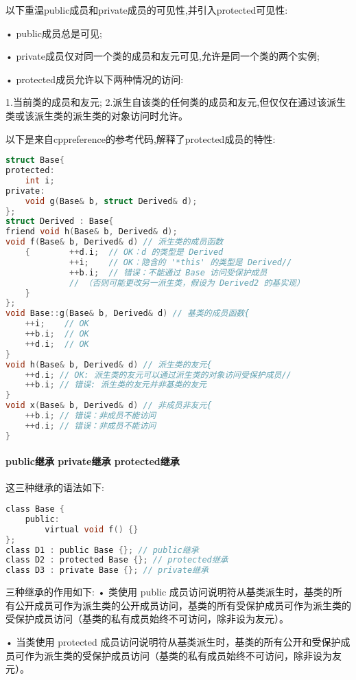\documentclass[UTF8]{ctexart}
\begin{document}
以下重温public成员和private成员的可见性,并引入protected可见性:

• public成员总是可见;

• private成员仅对同一个类的成员和友元可见,允许是同一个类的两个实例;

• protected成员允许以下两种情况的访问:

1.当前类的成员和友元;
2.派生自该类的任何类的成员和友元,但仅仅在通过该派生类或该派生类的派生类的对象访问时允许。

以下是来自cppreference的参考代码,解释了protected成员的特性:
\begin{lstlisting}[language = C,basicstyle=\small\ttfamily]
struct Base{
protected:    
    int i;
private:   
    void g(Base& b, struct Derived& d);
};
struct Derived : Base{    
friend void h(Base& b, Derived& d);    
void f(Base& b, Derived& d) // 派生类的成员函数    
    {        ++d.i;  // OK：d 的类型是 Derived        
             ++i;    // OK：隐含的 '*this' 的类型是 Derived//      
             ++b.i;  // 错误：不能通过 Base 访问受保护成员                
             // （否则可能更改另一派生类，假设为 Derived2 的基实现）    
    }
};
void Base::g(Base& b, Derived& d) // 基类的成员函数{    
    ++i;    // OK    
    ++b.i;  // OK   
    ++d.i;  // OK
}
void h(Base& b, Derived& d) // 派生类的友元{    
    ++d.i; // OK: 派生类的友元可以通过派生类的对象访问受保护成员// 
    ++b.i; // 错误: 派生类的友元并非基类的友元
}
void x(Base& b, Derived& d) // 非成员非友元{    
    ++b.i; // 错误：非成员不能访问 
    ++d.i; // 错误：非成员不能访问
}
\end{lstlisting}

\paragraph{public继承 private继承 protected继承}
这三种继承的语法如下:
\begin{lstlisting}[language = C,basicstyle=\small\ttfamily]
class Base { 
    public: 
        virtual void f() {}
};
class D1 : public Base {}; // public继承
class D2 : protected Base {}; // protected继承
class D3 : private Base {}; // private继承
\end{lstlisting}
三种继承的作用如下:
• 类使用 public 成员访问说明符从基类派生时，基类的所有公开成员可作为派生类的公开成员访问，基类的所有受保护成员可作为派生类的受保护成员访问（基类的私有成员始终不可访问，除非设为友元）。

• 当类使用 protected 成员访问说明符从基类派生时，基类的所有公开和受保护成员可作为派生类的受保护成员访问（基类的私有成员始终不可访问，除非设为友元）。
\end{document}
